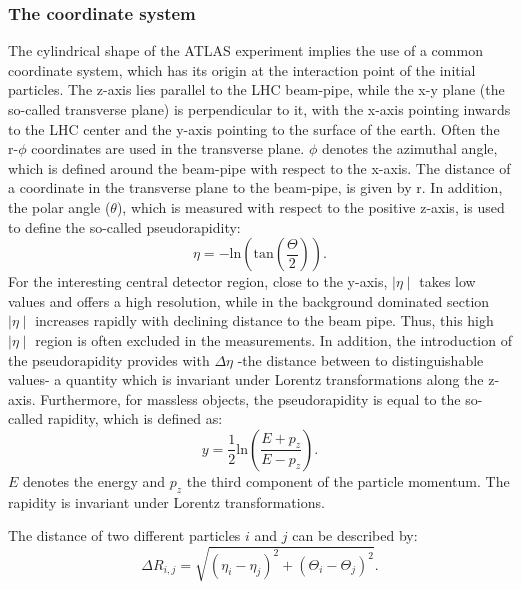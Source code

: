 \subsubsection{The coordinate system }\label{Coordinate}
The cylindrical shape of the ATLAS experiment implies the use of a common coordinate system, which has its origin at the interaction point of the initial particles. 
The z-axis lies parallel to the LHC beam-pipe, while the  x-y plane (the so-called transverse plane)  is perpendicular to it, with the x-axis pointing inwards to the LHC center and the y-axis pointing to the surface of the earth.  Often the r-$\phi$ coordinates are used in the transverse plane.
 $\phi$ denotes the azimuthal angle, which is defined  around the beam-pipe with respect to the x-axis.
 The distance of a coordinate in the transverse plane to the beam-pipe, is given by r.  
 In addition, the polar angle ($\theta$), which is measured  with respect to the positive z-axis, is used to define the so-called pseudorapidity:
\begin{equation}\label{pseudorapidity}\eta = -\text{ln}\left(\text{tan}\left(\frac{\Theta}{2}\right)\right).
\end{equation}  
 For the interesting central detector region, close to the y-axis, $\mid\eta\mid$ takes low values and offers a high resolution, while in the background dominated section $\mid\eta\mid$ increases rapidly with declining distance to the beam pipe. Thus, this high $\mid\eta\mid$  region is often excluded in the measurements. In addition, the introduction of the pseudorapidity provides with $\Delta \eta$ -the distance between to distinguishable values- a quantity which is invariant under Lorentz transformations along the z-axis. Furthermore, for massless objects, the pseudorapidity is equal to the so-called rapidity, which is defined as:
\begin{equation}\label{rapidity}
y = \frac{1}{2}\text{ln}\left(\frac{E + p_z}{E - p_z}\right).
\end{equation}
$E$ denotes the energy and $p_z$ the third component of the particle momentum. The rapidity is invariant under Lorentz transformations. 


The distance of two different particles $i$ and $j$ can be described by:
\begin{equation}\label{dinstance}
\Delta R_{i,j} = \sqrt{(\eta_i-\eta_j)^2+(\Theta_i-\Theta_j)^2}.
\end{equation}
   

